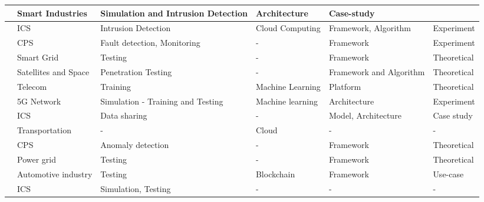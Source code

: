 \begin{table}[H]
\begin{NiceTabular}{p{0.5cm}|p{3cm}|p{2.5cm}|p{2cm}|p{3cm}|p{1.5cm}}
    \cite{hussainiTaxonomySecurityDefense2022} & Smart Industries & Simulation and Intrusion Detection & Architecture & Case-study \\
    \hline

    \cite{akbarianSecurityFrameworkDigital2021} & ICS & Intrusion Detection & Cloud Computing & Framework, Algorithm & Experiment \\
    \hline

    \cite{xuGametheoreticApproachSecure2020} & CPS & Fault detection, Monitoring & - & Framework & Experiment \\
    \hline

    \cite{atalayDigitalTwinsApproach2020} & Smart Grid & Testing & - & Framework & Theoretical \\
    \hline

    \cite{houDigitalTwinRuntime2022} & Satellites and Space & Penetration Testing & - & Framework and Algorithm & Theoretical \\
    \hline

    \cite{vakarukDigitalTwinNetwork2021} & Telecom & Training & Machine Learning & Platform & Theoretical \\
    \hline

    \cite{rebecchiDigitalTwin5G2022} & 5G Network & Simulation - Training and Testing & Machine learning & Architecture & Experiment \\
    \hline

    \cite{gehrmannDigitalTwinBased2020} & ICS &  Data sharing & - & Model, Architecture & Case study \\
    \hline

    \cite{chengzhelaiSPDTSecurePrivacyPreserving2022} & Transportation & - & Cloud & - & - \\
    \hline

    \cite{alessandradebenedictischristiancarmineespositoalessandrasommaAdoptionSecureCyber2022} & CPS & Anomaly detection & - & Framework & Theoretical \\
    \hline

    \cite{olivares-rojasCybersecuritySmartGrid2022} & Power grid & Testing & - & Framework & Theoretical \\
    \hline

    \cite{suhailSituationalAwareCyberphysical2022} & Automotive industry & Testing & Blockchain & Framework & Use-case \\
    \hline

    \cite{dietzUnleashingDigitalTwin2020} &  ICS & Simulation, Testing & - & - & - \\
    \hline
\bottomrule
\end{NiceTabular}
\end{table}



% 



% 

% 
